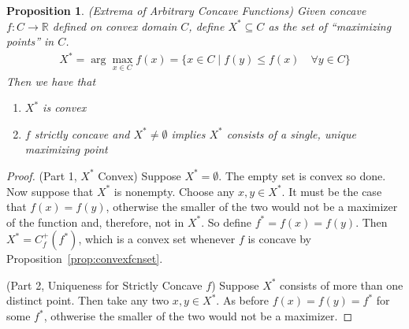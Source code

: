 \documentclass[12pt]{book}
\numberwithin{equation}{section} %
\theoremstyle{plain}
\newtheorem{prop}[thm]{Proposition}
\theoremstyle{definition}
\theoremstyle{remark}
\newcommand{\R}{\mathbb{R}}
\begin{document}
\begin{prop}{\emph{(Extrema of Arbitrary Concave Functions)}}
Given concave $f:C\rightarrow \R$ defined on convex domain $C$, define
$X^*\subseteq C$ as the set of ``maximizing points'' in $C$.
\begin{align*}
  X^* = \arg\max_{x\in C} f(x)
  = \{ x \in C \; | \; f(y) \leq f(x) \quad \forall y \in C\}
\end{align*}
Then we have that
\begin{enumerate}
  \item $X^*$ is convex
  \item $f$ strictly concave and $X^*\neq \emptyset$ implies $X^*$
    consists of a single, \emph{unique} maximizing point
\end{enumerate}
\end{prop}
\begin{proof}


(Part 1, $X^*$ Convex) Suppose $X^*=\emptyset$. The empty set is convex
so done.  Now suppose that $X^*$ is nonempty. Choose any $x,y\in X^*$.
It must be the case that $f(x) = f(y)$, otherwise the smaller of the two
would not be a maximizer of the function and, therefore, not in $X^*$.
So define $f^* = f(x) = f(y)$.  Then $X^* = C^+_f(f^*)$, which is a
convex set whenever $f$ is concave by
Proposition~\ref{prop:convexfcnset}.

(Part 2, Uniqueness for Strictly Concave $f$)
Suppose $X^*$ consists of more than one distinct point. Then take any
two $x,y\in X^*$. As before $f(x)=f(y)=f^*$ for some $f^*$, othwerise
the smaller of the two would not be a maximizer.


\end{proof}
\end{document}
